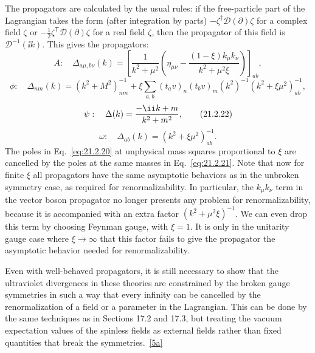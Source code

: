The propagators are calculated by the usual rules: if the free-particle
part of the Lagrangian takes the form (after integration by parts)
$-\zeta^\dagger\mathcal D(\partial)\zeta$ for a complex field $\zeta$ or
$-\frac12\zeta^{\mathsf T}\mathcal D(\partial)\zeta$ for a real field $\zeta$, then
the propagator of this field is $\mathcal D^{-1}(\ii k)$. This gives the
propagators:
\begin{equation}
 A:\quad
 \Delta_{a\mu,b\nu}(k)
 =\left[
 \frac1{k^2+\mu^2}
 \left(\eta_{\mu\nu}
 -\frac{(1-\xi)k_\mu k_\nu}{k^2+\mu^2\xi}\right)
 \right]_{ab},
 \tag{21.2.20}\label{eq:21.2.20}
\end{equation}
\begin{equation}
 \phi:\quad
 \Delta_{nm}(k)
 =(k^2+M^2)^{-1}_{nm}
 +\xi\sum_{a,b}
 (t_a v)_n(t_b v)_m
 (k^2)^{-1}(k^2+\xi\mu^2)^{-1}_{ab},
 \tag{21.2.21}\label{eq:21.2.21}
\end{equation}
\begin{equation}
 \psi:\quad
 \Delta(k)=\frac{-\ii\sl{k}+m}{k^2+m^2},
 \tag{21.2.22}\label{eq:21.2.22}
\end{equation}
\begin{equation}
 \omega:\quad
 \Delta_{ab}(k)
 =(k^2+\xi\mu^2)^{-1}_{ab}.
 \tag{21.2.23}\label{eq:21.2.23}
\end{equation}
The poles in Eq.~\eqref{eq:21.2.20} at unphysical mass squares proportional
to $\xi$ are cancelled by the poles at the same masses in
Eq.~\eqref{eq:21.2.21}. Note that now for finite $\xi$ all propagators have
the same asymptotic behaviors as in the unbroken symmetry case, as required
for renormalizability. In particular, the $k_\mu k_\nu$ term in the vector
boson propagator no longer presents any problem for renormalizability,
because it is accompanied with an extra factor
$(k^2+\mu^2\xi)^{-1}$. We can even drop this term by choosing Feynman
gauge, with $\xi=1$. It is only in the unitarity gauge case where
$\xi\to\infty$ that this factor fails to give the propagator the asymptotic
behavior needed for renormalizability.

Even with well-behaved propagators, it is still necessary to show that the
ultraviolet divergences in these theories are constrained by the broken
gauge symmetries in such a way that every infinity can be cancelled by the
renormalization of a field or a parameter in the Lagrangian. This can be
done by the same techniques as in Sections 17.2 and 17.3, but treating the
vacuum expectation values of the spinless fields as external fields rather
than fixed quantities that break the
symmetries.~\hyperref[ch21-ref-5a]{[5a]}
